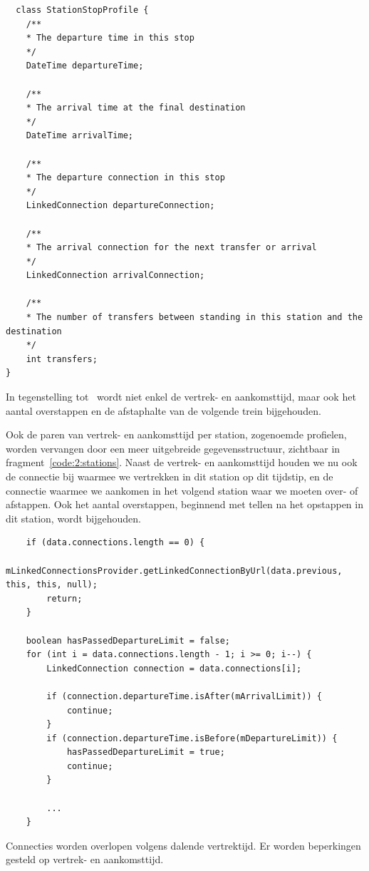 \begin{listing}[htb]
\begin{verbatim}
  class StationStopProfile {
	/**
	* The departure time in this stop
	*/
	DateTime departureTime;
	
	/**
	* The arrival time at the final destination
	*/
	DateTime arrivalTime;
	
	/**
	* The departure connection in this stop
	*/
	LinkedConnection departureConnection;
	
	/**
	* The arrival connection for the next transfer or arrival
	*/
	LinkedConnection arrivalConnection;
	
	/**
	* The number of transfers between standing in this station and the destination
	*/
	int transfers;
}
	\end{verbatim}
		\caption[CSA: Gegevensstructuur voor stopprofielen]{In tegenstelling tot~\cite{strasser17} wordt niet enkel de vertrek- en aankomsttijd, maar ook het aantal overstappen en de afstaphalte van de volgende trein bijgehouden.}
	\label{code:2:stations}
\end{listing}


Ook de paren van vertrek- en aankomsttijd per station, zogenoemde profielen, worden vervangen door een meer uitgebreide gegevensstructuur, zichtbaar in fragment~\ref{code:2:stations}. Naast de vertrek- en aankomsttijd houden we nu ook de connectie bij waarmee we vertrekken in dit station op dit tijdstip, en de connectie waarmee we aankomen in het volgend station waar we moeten over- of afstappen. Ook het aantal overstappen, beginnend met tellen na het opstappen in dit station, wordt bijgehouden.

\begin{listing}[htb]
\begin{verbatim}
	if (data.connections.length == 0) {
		mLinkedConnectionsProvider.getLinkedConnectionByUrl(data.previous, this, this, null);
		return;
	}
	
	boolean hasPassedDepartureLimit = false;
	for (int i = data.connections.length - 1; i >= 0; i--) {
		LinkedConnection connection = data.connections[i];
		
		if (connection.departureTime.isAfter(mArrivalLimit)) {
			continue;
		}
		if (connection.departureTime.isBefore(mDepartureLimit)) {
			hasPassedDepartureLimit = true;
			continue;
		}
		
		...
	}
	\end{verbatim}
			\caption[CSA: Overlopen van connecties]{Connecties worden overlopen volgens dalende vertrektijd. Er worden beperkingen gesteld op vertrek- en aankomsttijd.}
	\label{code:2:csaloop}
\end{listing}

